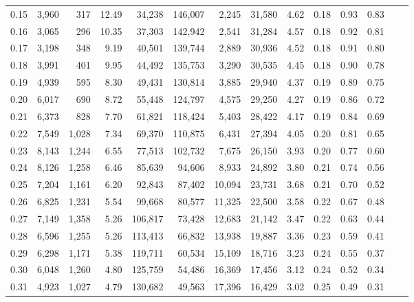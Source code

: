 \begin{tabular}{rrrrrrrrrrrrrr}
0.15 &  3,960 &    317 &   12.49 &   34,238 &  146,007 &   2,245 &  31,580 &  4.62 &  0.18 &  0.93 &      0.83 \\
0.16 &  3,065 &    296 &   10.35 &   37,303 &  142,942 &   2,541 &  31,284 &  4.57 &  0.18 &  0.92 &      0.81 \\
0.17 &  3,198 &    348 &    9.19 &   40,501 &  139,744 &   2,889 &  30,936 &  4.52 &  0.18 &  0.91 &      0.80 \\
0.18 &  3,991 &    401 &    9.95 &   44,492 &  135,753 &   3,290 &  30,535 &  4.45 &  0.18 &  0.90 &      0.78 \\
0.19 &  4,939 &    595 &    8.30 &   49,431 &  130,814 &   3,885 &  29,940 &  4.37 &  0.19 &  0.89 &      0.75 \\
0.20 &  6,017 &    690 &    8.72 &   55,448 &  124,797 &   4,575 &  29,250 &  4.27 &  0.19 &  0.86 &      0.72 \\
0.21 &  6,373 &    828 &    7.70 &   61,821 &  118,424 &   5,403 &  28,422 &  4.17 &  0.19 &  0.84 &      0.69 \\
0.22 &  7,549 &  1,028 &    7.34 &   69,370 &  110,875 &   6,431 &  27,394 &  4.05 &  0.20 &  0.81 &      0.65 \\
0.23 &  8,143 &  1,244 &    6.55 &   77,513 &  102,732 &   7,675 &  26,150 &  3.93 &  0.20 &  0.77 &      0.60 \\
0.24 &  8,126 &  1,258 &    6.46 &   85,639 &   94,606 &   8,933 &  24,892 &  3.80 &  0.21 &  0.74 &      0.56 \\
0.25 &  7,204 &  1,161 &    6.20 &   92,843 &   87,402 &  10,094 &  23,731 &  3.68 &  0.21 &  0.70 &      0.52 \\
0.26 &  6,825 &  1,231 &    5.54 &   99,668 &   80,577 &  11,325 &  22,500 &  3.58 &  0.22 &  0.67 &      0.48 \\
0.27 &  7,149 &  1,358 &    5.26 &  106,817 &   73,428 &  12,683 &  21,142 &  3.47 &  0.22 &  0.63 &      0.44 \\
0.28 &  6,596 &  1,255 &    5.26 &  113,413 &   66,832 &  13,938 &  19,887 &  3.36 &  0.23 &  0.59 &      0.41 \\
0.29 &  6,298 &  1,171 &    5.38 &  119,711 &   60,534 &  15,109 &  18,716 &  3.23 &  0.24 &  0.55 &      0.37 \\
0.30 &  6,048 &  1,260 &    4.80 &  125,759 &   54,486 &  16,369 &  17,456 &  3.12 &  0.24 &  0.52 &      0.34 \\
0.31 &  4,923 &  1,027 &    4.79 &  130,682 &   49,563 &  17,396 &  16,429 &  3.02 &  0.25 &  0.49 &      0.31 \\

\end{tabular}
